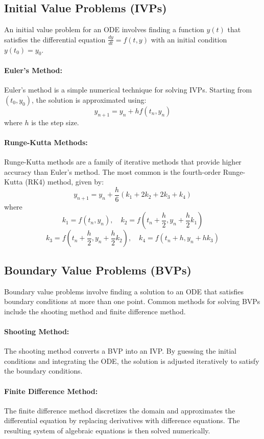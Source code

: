 \documentclass[12pt]{article}
\begin{document}
\subsection{Initial Value Problems (IVPs)}
An initial value problem for an ODE involves finding a function \( y(t) \) that satisfies the differential equation \( \frac{dy}{dt} = f(t, y) \) with an initial condition \( y(t_0) = y_0 \).

\paragraph{Euler's Method:}
Euler's method is a simple numerical technique for solving IVPs. Starting from \( (t_0, y_0) \), the solution is approximated using:
\[
y_{n+1} = y_n + h f(t_n, y_n)
\]
where \( h \) is the step size.

\paragraph{Runge-Kutta Methods:}
Runge-Kutta methods are a family of iterative methods that provide higher accuracy than Euler's method. The most common is the fourth-order Runge-Kutta (RK4) method, given by:
\[
y_{n+1} = y_n + \frac{h}{6} (k_1 + 2k_2 + 2k_3 + k_4)
\]
where
\[
k_1 = f(t_n, y_n), \quad k_2 = f\left(t_n + \frac{h}{2}, y_n + \frac{h}{2}k_1\right)
\]
\[
k_3 = f\left(t_n + \frac{h}{2}, y_n + \frac{h}{2}k_2\right), \quad k_4 = f(t_n + h, y_n + h k_3)
\]

\subsection{Boundary Value Problems (BVPs)}
Boundary value problems involve finding a solution to an ODE that satisfies boundary conditions at more than one point. Common methods for solving BVPs include the shooting method and finite difference method.

\paragraph{Shooting Method:}
The shooting method converts a BVP into an IVP. By guessing the initial conditions and integrating the ODE, the solution is adjusted iteratively to satisfy the boundary conditions.

\paragraph{Finite Difference Method:}
The finite difference method discretizes the domain and approximates the differential equation by replacing derivatives with difference equations. The resulting system of algebraic equations is then solved numerically.
\end{document}
